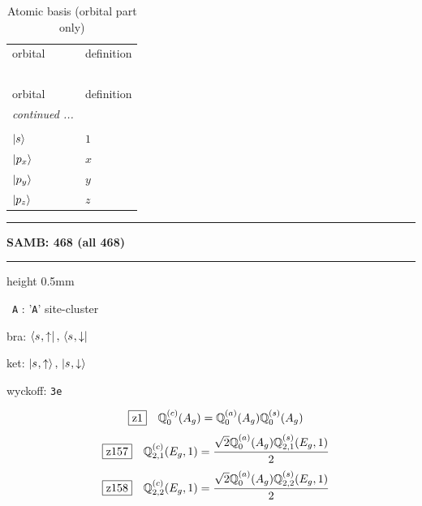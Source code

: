\documentclass[fleqn,10pt,landscape]{jsarticle}
\begin{document}
\begin{longtable}[l]{ll}
\captionsetup{justification=raggedright, singlelinecheck=off}
\caption{Atomic basis (orbital part only)}
 \\
 \hline \hline
orbital & definition \\ \hline \endfirsthead

\multicolumn{1}{l}{\tablename\ \thetable{}} \\
 \hline \hline
orbital & definition \\ \hline \endhead

 \hline \hline
\multicolumn{1}{r}{\footnotesize\it continued ...} \\ \endfoot

 \hline \hline
\multicolumn{1}{r}{} \\ \endlastfoot

$ \ket{s} $ & $ 1 $ \\ \hline
$ \ket{p_{x}} $ & $ x $ \\
$ \ket{p_{y}} $ & $ y $ \\
$ \ket{p_{z}} $ & $ z $ \\
\end{longtable}
\vspace{5mm}
\noindent \rule[0.5mm]{5mm}{0.5mm}\hspace{3mm}\textbf{SAMB: 468 (all 468)}\hspace{3mm}\leaders\hrule height 0.5mm\hfill\kern0pt
\vspace{3mm}

\vspace{5mm}

\noindent\textbullet\, \texttt{A} : '\texttt{A}' site-cluster

\noindent\quad * bra: $\bra{s_{},\uparrow},\, \bra{s_{},\downarrow}$

\noindent\quad * ket: $\ket{s_{},\uparrow},\, \ket{s_{},\downarrow}$

\noindent\quad * wyckoff: \texttt{3e}

\begin{dmath*}
\hspace*{3mm}\fbox{z1}\quad \mathbb{Q}_{0}^{(c)}(A_{g})=\mathbb{Q}_{0}^{(a)}(A_{g}) \mathbb{Q}_{0}^{(s)}(A_{g})
\end{dmath*}
\begin{dmath*}
\hspace*{3mm}\fbox{z157}\quad \mathbb{Q}_{2,1}^{(c)}(E_{g},1)=\frac{\sqrt{2} \mathbb{Q}_{0}^{(a)}(A_{g}) \mathbb{Q}_{2,1}^{(s)}(E_{g},1)}{2}
\end{dmath*}
\begin{dmath*}
\hspace*{3mm}\fbox{z158}\quad \mathbb{Q}_{2,2}^{(c)}(E_{g},1)=\frac{\sqrt{2} \mathbb{Q}_{0}^{(a)}(A_{g}) \mathbb{Q}_{2,2}^{(s)}(E_{g},1)}{2}
\end{dmath*}
\vspace{5mm}
\end{document}
